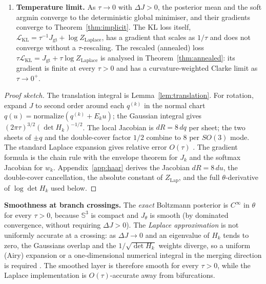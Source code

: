 \begin{theorem}
\begin{enumerate}
\begin{equation}
\begin{split}
\end{split}
\label{eq:dlogdet}
\end{equation}
The second term contains third $q$-derivatives of $J$.
\item \textbf{Temperature limit.} As $\tau\to0$ with $\Delta J>0$, the posterior mean and the soft argmin converge to the deterministic global minimiser, and their gradients converge to Theorem~\ref{thm:implicit}. The KL loss itself, $\mathcal{L}_{\mathrm{KL}}=\tau^{-1}J_{\mathrm{gt}}+\log Z_{\mathrm{Laplace}}$, has a gradient that scales as $1/\tau$ and does not converge without a $\tau$-rescaling. The rescaled (annealed) loss $\tau\mathcal{L}_{\mathrm{KL}}=J_{\mathrm{gt}}+\tau\log Z_{\mathrm{Laplace}}$ is analysed in Theorem~\ref{thm:annealed}: its gradient is finite at every $\tau>0$ and has a curvature-weighted Clarke limit as $\tau\to0^+$.
\end{enumerate}
\end{theorem}

\begin{proof}[Proof sketch]
The translation integral is Lemma~\ref{lem:translation}. For rotation, expand $J$ to second order around each $q^{(k)}$ in the normal chart $q(u)=\mathrm{normalize}(q^{(k)}+E_ku)$; the Gaussian integral gives $(2\pi\tau)^{3/2}(\det H_k)^{-1/2}$. The local Jacobian is $dR=8\,dq$ per sheet; the two sheets of $\pm q$ and the double-cover factor $1/2$ combine to $8$ per $SO(3)$ mode. The standard Laplace expansion gives relative error $O(\tau)$ \cite{bleistein1986,wong1989}. The gradient formula is the chain rule with the envelope theorem for $J_k$ and the softmax Jacobian for $w_k$. Appendix~\ref{app:haar} derives the Jacobian $dR=8\,du$, the double-cover cancellation, the absolute constant of $Z_{\mathrm{Lap}}$, and the full $\theta$-derivative of $\log\det H_k$ used below.
\end{proof}

\textbf{Smoothness at branch crossings.} The \emph{exact} Boltzmann posterior is $C^\infty$ in $\theta$ for every $\tau>0$, because $\mathbb{S}^3$ is compact and $J_\theta$ is smooth (by dominated convergence, without requiring $\Delta J>0$). The \emph{Laplace approximation} is not uniformly accurate at a crossing: as $\Delta J\to0$ and an eigenvalue of $H_k$ tends to zero, the Gaussians overlap and the $1/\sqrt{\det H_k}$ weights diverge, so a uniform (Airy) expansion or a one-dimensional numerical integral in the merging direction is required \cite{bleistein1986}. The smoothed layer is therefore smooth for every $\tau>0$, while the Laplace implementation is $O(\tau)$-accurate away from bifurcations.

